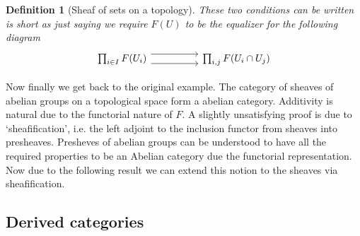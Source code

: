 \documentclass[12pt]{article}
\numberwithin{equation}{section}
\newcounter{dummy} \numberwithin{dummy}{section}
\newtheorem{definition}[dummy]{Definition}
\newtheorem{proposition}[dummy]{Proposition}
\begin{document}
\begin{appendices}
\begin{enumerate}
\begin{definition}[Sheaf of sets on a topology]
			These two conditions can be written is short as just saying we require $F(U)$ to be the equalizer for the following diagram
			\[\begin{tikzcd}
				{\prod_{i \in I} F(U_i)} && {\prod_{i,j}F(U_i \cap U_j)}
				\arrow[shift right=2, from=1-1, to=1-3]
				\arrow[shift left=2, from=1-1, to=1-3]
			\end{tikzcd}\]
		\end{definition}
		
		Now finally we get back to the original example. The category of sheaves of abelian groups on a topological space form a abelian category. Additivity is natural due to the functorial nature of $F$. A slightly unsatisfying proof is due to `sheafification', i.e. the left adjoint to the inclusion functor from sheaves into presheaves. Presheves of abelian groups can be understood to have all the required properties to be an Abelian category due the functorial representation. Now due to the following result \cite{stacks1} we can extend this notion to the sheaves via sheafification.
	\end{enumerate}
	
	
	
	\subsection{Derived categories}

\end{appendices}
\end{document}
